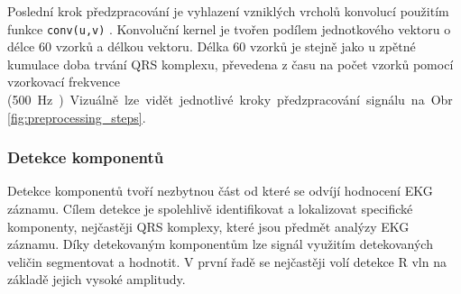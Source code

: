 Poslední krok předzpracování je vyhlazení vzniklých vrcholů konvolucí použitím
funkce \texttt{conv(u,v)} \cite{matlabCONV}. Konvoluční kernel je tvořen podílem
jednotkového vektoru o délce 60 vzorků a délkou vektoru. Délka 60 vzorků je
stejně jako u zpětné kumulace doba trvání QRS komplexu, převedena z času na
počet vzorků pomocí vzorkovací frekvence (500~\si\Hz). Vizuálně lze vidět
jednotlivé kroky předzpracování signálu na Obr.~\ref{fig:preprocessing_steps}.

\subsubsection{Detekce komponentů}
\label{section:components_detection}
Detekce komponentů tvoří nezbytnou část od které se odvíjí hodnocení EKG
záznamu. Cílem detekce je spolehlivě identifikovat a lokalizovat specifické
komponenty, nejčastěji QRS komplexy, které jsou předmět analýzy EKG záznamu.
Díky detekovaným komponentům lze signál využitím detekovaných veličin
segmentovat a hodnotit. V první řadě se nejčastěji volí detekce R vln na základě
jejich vysoké amplitudy.

